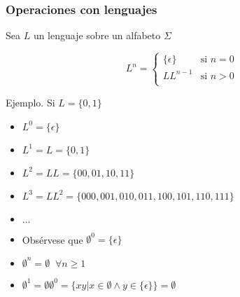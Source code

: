 \begin{frame}
  \frametitle{Operaciones con lenguajes}
			  Sea $L$ un lenguaje sobre un alfabeto $\Sigma$
      \pause

      \begin{defi}
                   \begin{displaymath}
                   L^n = \left\{ \begin{array}{ll}
                                  \{\epsilon\} & \textrm{si $n = 0$} \\
                                  LL^{n-1} & \textrm{si $n > 0$} \\
                                  \end{array} \right.
                   \end{displaymath}
      \end{defi}
      \pause
      \begin{block}{Ejemplo. Si $L = \{ 0 , 1 \}$ }
           \begin{itemize}[<+->]
           \item $L^0 = \{ \epsilon \}$
           \item $L^1 = L =  \{ 0 , 1 \}$
           \item $L^2 = LL = \{ 00, 01, 10, 11 \}$
           \item $L^3 = LL^2 = \{ 000, 001, 010, 011, 100, 101, 110, 111 \}$
           \item $\ldots$
           \item Obsérvese que $\emptyset ^ 0 =  \{ \epsilon \}$
           \item $\emptyset ^ n = \emptyset \; \; \forall n \geq 1$
           \item $\emptyset ^ 1 = \emptyset \emptyset^0 = \{xy | x \in \emptyset \wedge y \in \{\epsilon\} \} = \emptyset$
           \end{itemize}
			\end{block}
\end{frame}
